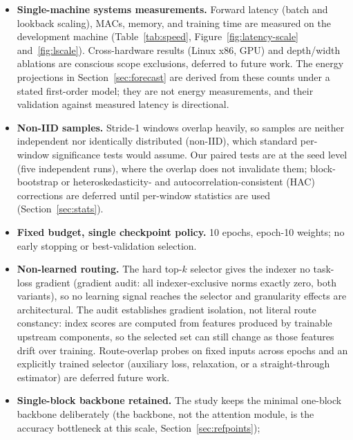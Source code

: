 \begin{itemize}
        ProbSparse, iTransformer, TimesNet, state-space-model baselines) remain pending
        (Appendix future-work item~3).
  \item \textbf{Single-machine systems measurements.} Forward latency
        (batch and lookback scaling), MACs, memory, and training time are
        measured on the development machine (Table~\ref{tab:speed},
        Figure~\ref{fig:latency-scale} and~\ref{fig:lscale}). Cross-hardware
        results (Linux x86, GPU) and depth/width ablations are conscious
        scope exclusions, deferred to future work. The energy projections
        in Section~\ref{sec:forecast} are derived from these counts under
        a stated first-order model; they are not energy measurements, and
        their validation against measured latency is directional.
  \item \textbf{Non-IID samples.} Stride-1 windows overlap heavily, so samples
        are neither independent nor identically distributed (non-IID), which
        standard per-window significance tests would assume. Our paired tests are at the seed level (five
        independent runs), where the overlap does not invalidate them;
        block-bootstrap or heteroskedasticity- and autocorrelation-consistent (HAC)
        corrections are deferred until
        per-window statistics are used (Section~\ref{sec:stats}).
  \item \textbf{Fixed budget, single checkpoint policy.} 10 epochs,
        epoch-10 weights; no early stopping or best-validation selection.
  \item \textbf{Non-learned routing.} The hard top-$k$ selector gives the indexer no
        task-loss gradient (gradient audit: all indexer-exclusive norms exactly zero,
        both variants), so no learning signal reaches the selector and granularity
        effects are architectural. The audit establishes gradient isolation, not
        literal route constancy: index scores are computed from features produced by
        trainable upstream components, so the selected set can still change as those
        features drift over training. Route-overlap probes on fixed inputs across
        epochs and an explicitly trained selector (auxiliary loss, relaxation, or a
        straight-through estimator) are
        deferred future work.
  \item \textbf{Single-block backbone retained.} The study keeps the minimal
        one-block backbone deliberately (the backbone, not the attention module,
        is the accuracy bottleneck at this scale, Section~\ref{sec:refpoints});

\end{itemize}
